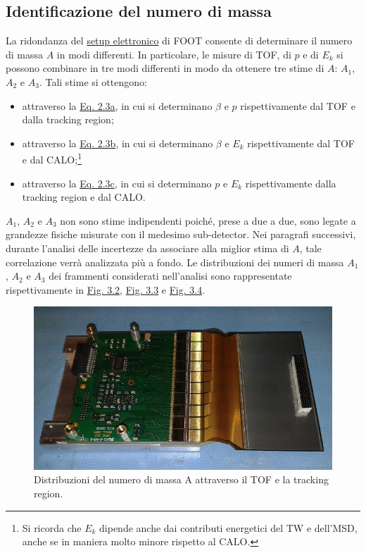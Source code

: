 \documentclass[12pt,a4paper,twoside]{report}
\begin{document}
	\subsection{Identificazione del numero di massa}
	La ridondanza del \hyperref[sec:setupElettronico]{setup elettronico} di FOOT consente di determinare il numero di massa $A$ in modi differenti. In particolare, le misure di TOF, di $p$ e di $E_k$ si possono combinare in tre modi differenti in modo da ottenere tre stime di $A$: $A_1$, $A_2$ e $A_3$. Tali stime si ottengono:
	\begin{itemize}
		\item attraverso la \hyperref[eq:a1]{Eq. 2.3a}, in cui si determinano $\beta$ e $p$ rispettivamente dal TOF e dalla tracking region;
		\item attraverso la \hyperref[eq:a2]{Eq. 2.3b}, in cui si determinano $\beta$ e $E_k$ rispettivamente dal TOF e dal CALO;\footnote{Si ricorda che $E_k$ dipende anche dai contributi energetici del TW e dell'MSD, anche se in maniera molto minore rispetto al CALO.}
		\item attraverso la \hyperref[eq:a3]{Eq. 2.3c}, in cui si determinano $p$ e $E_k$ rispettivamente dalla tracking region e dal CALO.
	\end{itemize}
	$A_1$, $A_2$ e $A_3$ non sono stime indipendenti poiché, prese a due a due, sono legate a grandezze fisiche misurate con il medesimo sub-detector. Nei paragrafi successivi, durante l'analisi delle incertezze da associare alla miglior stima di $A$, tale correlazione verrà analizzata più a fondo. Le distribuzioni dei numeri di massa $A_1$, $A_2$ e $A_3$ dei frammenti considerati nell'analisi sono rappresentate rispettivamente in \hyperref[fig:a1]{Fig. 3.2}, \hyperref[fig:a2]{Fig. 3.3} e \hyperref[fig:a3]{Fig. 3.4}.
	\begin{figure}[H]
		\centering
		\includegraphics[width=0.9\linewidth]{msd.jpg}
		\caption{Distribuzioni del numero di massa A attraverso il TOF e la tracking region.}
		\label{fig:a1}
	\end{figure}
\end{document}
